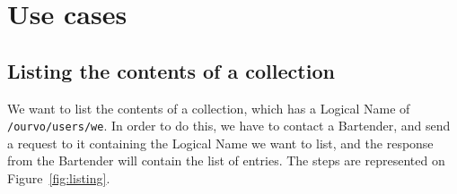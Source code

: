 \documentclass{book}
\begin{document}



\chapter{Use cases} %
\label{cha:use_cases}

\section{Listing the contents of a collection} %
\label{sec:listing_the_contents_of_a_collection}
\begin{figure}[ht]
\end{figure}

We want to list the contents of a collection, which has a Logical Name of \verb!/ourvo/users/we!. In order to do this, we have to contact a Bartender, and send a request to it containing the Logical Name we want to list, and the response from the Bartender will contain the list of entries. The steps are represented on Figure~\ref{fig:listing}.
\end{document}
